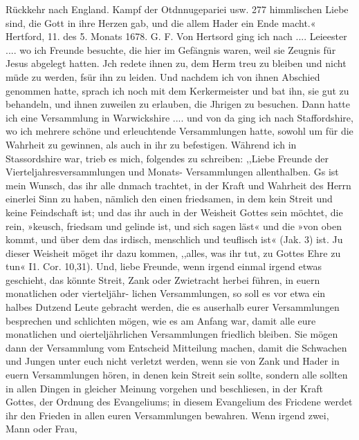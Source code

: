 Rückkehr nach England. Kampf der Otdnnugepariei usw. 277
himmlischen Liebe sind, die Gott in ihre Herzen gab, und die
allem Hader ein Ende macht.«
Hertford, 11. des 5. Monats 1678. G. F.
Von Hertsord ging ich nach .... Leieester .... wo ich
Freunde besuchte, die hier im Gefängnis waren, weil sie Zeugnis
für Jesus abgelegt hatten. Jch redete ihnen zu, dem Herm treu
zu bleiben und nicht müde zu werden, fsür ihn zu leiden. Und
nachdem ich von ihnen Abschied genommen hatte, sprach ich noch
mit dem Kerkermeister und bat ihn, sie gut zu behandeln, und
ihnen zuweilen zu erlauben, die Jhrigen zu besuchen. Dann hatte
ich eine Versammlung in Warwickshire .... und von da ging
ich nach Staffordshire, wo ich mehrere schöne und erleuchtende
Versammlungen hatte, sowohl um für die Wahrheit zu gewinnen,
als auch in ihr zu befestigen. Während ich in Stassordshire war,
trieb es mich, folgendes zu schreiben:
,,Liebe Freunde der Vierteljahresversammlungen und Monats-
Versammlungen allenthalben. Gs ist mein Wunsch, das ihr alle
dnmach trachtet, in der Kraft und Wahrheit des Herrn einerlei
Sinn zu haben, nämlich den einen friedsamen, in dem kein Streit
und keine Feindschaft ist; und das ihr auch in der Weisheit
Gottes sein möchtet, die rein, »keusch, friedsam und gelinde ist,
und sich sagen läst« und die »von oben kommt, und über dem
das irdisch, menschlich und teuflisch ist« (Jak. 3) ist. Ju dieser
Weisheit möget ihr dazu kommen, ,,alles, was ihr tut, zu Gottes
Ehre zu tun« I1. Cor. 10,31). Und, liebe Freunde, wenn irgend
einmal irgend etwas geschieht, das könnte Streit, Zank oder
Zwietracht herbei führen, in euern monatlichen oder vierteljähr-
lichen Versammlungen, so soll es vor etwa ein halbes Dutzend
Leute gebracht werden, die es auserhalb eurer Versammlungen
besprechen und schlichten mögen, wie es am Anfang war, damit
alle eure monatlichen und oierteljährlichen Versammlungen friedlich
bleiben. Sie mögen dann der Versammlung vom Entscheid Mitteilung
machen, damit die Schwachen und Jungen unter euch nicht verletzt
werden, wenn sie von Zank und Hader in euern Versammlungen
hören, in denen kein Streit sein sollte, sondern alle sollten in
allen Dingen in gleicher Meinung vorgehen und beschliesen, in
der Kraft Gottes, der Ordnung des Evangeliums; in diesem
Evangelium des Fricdene werdet ihr den Frieden in allen euren
Versammlungen bewahren. Wenn irgend zwei, Mann oder Frau,


